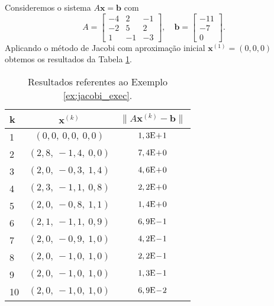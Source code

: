 \begin{ex}\label{ex:jacobi_exec}
  Consideremos o sistema $A\pmb{x} = \pmb{b}$ com
  \begin{equation}
    A =
    \begin{bmatrix}
      -4 & 2 & -1 \\
      -2 & 5 & 2 \\
       1 & -1 & -3
    \end{bmatrix},\quad
    \pmb{b} =
    \begin{bmatrix}
      -11\\ -7\\ 0
    \end{bmatrix}.
  \end{equation}
  Aplicando o método de Jacobi com aproximação inicial $\pmb{x}^{(1)} = (0, 0, 0)$ obtemos os resultados da Tabela \ref{tab:ex_jacobi_exec}.

  \begin{table}[h!]
    \centering
    \begin{tabular}{l|cc}
      k & $\pmb{x}^{(k)}$ & $\|A\pmb{x}^{(k)}-\pmb{b}\|$\\\hline
      1 & $(0,0,~0,0,~0,0)$ & $1,3\mathrm{E}\!+\!1$\\
      2 & $(2,8,~-1,4,~0,0)$ & $7,4\mathrm{E}\!+\!0$ \\
      3 & $(2,0,~-0,3,~1,4)$ & $4,6\mathrm{E}\!+\!0$ \\
      4 & $(2,3,~-1,1,~0,8)$ & $2,2\mathrm{E}\!+\!0$ \\
      5 & $(2,0,~-0,8,~1,1)$ & $1,4\mathrm{E}\!+\!0$ \\
      6 & $(2,1,~-1,1,~0,9)$ & $6,9\mathrm{E}\!-\!1$ \\
      7 & $(2,0,~-0,9,~1,0)$ & $4,2\mathrm{E}\!-\!1$ \\
      8 & $(2,0,~-1,0,~1,0)$ & $2,2\mathrm{E}\!-\!1$ \\
      9 & $(2,0,~-1,0,~1,0)$ & $1,3\mathrm{E}\!-\!1$ \\
      10 & $(2,0,~-1,0,~1,0)$ & $6,9\mathrm{E}\!-\!2$ \\\hline
    \end{tabular}
    \caption{Resultados referentes ao Exemplo \ref{ex:jacobi_exec}.}
    \label{tab:ex_jacobi_exec}
  \end{table}

% 
\end{ex}

